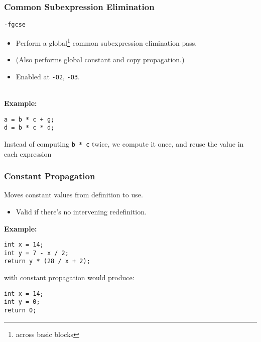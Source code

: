 \documentclass[aspectratio=43]{beamer}
\newenvironment{changemargin}[1]{%
  \begin{list}{}{%
    \setlength{\topsep}{0pt}%
    \setlength{\leftmargin}{#1}%
    \setlength{\rightmargin}{1em}
    \setlength{\listparindent}{\parindent}%
    \setlength{\itemindent}{\parindent}%
    \setlength{\parsep}{\parskip}%
  }%
  \item[]}{\end{list}}
\begin{document}
\begin{frame}[fragile]
  \frametitle{Common Subexpression Elimination}

  \begin{changemargin}{1.5cm}

  {\tt -fgcse}

  \begin{itemize}
    \item Perform a global\footnote{across basic blocks} common subexpression elimination pass.
    \item (Also performs global constant and copy propagation.)
    \item Enabled at {\tt -O2}, {\tt -O3}.
  \end{itemize}
  ~\\[1em]

  {\bf Example:} 

  \begin{lstlisting}
a = b * c + g;
d = b * c * d;
  \end{lstlisting}

  Instead of computing {\tt b * c} twice, we compute it once, and reuse the
  value in each expression
  \end{changemargin}
\end{frame}

\begin{frame}[fragile]
  \frametitle{Constant Propagation}

  \begin{changemargin}{2cm}

  Moves constant values from definition to use.

  \begin{itemize}
    \item Valid if there's no intervening redefinition.
  \end{itemize}
  \vfill
  {\bf Example:}
  \begin{lstlisting}
int x = 14;
int y = 7 - x / 2;
return y * (28 / x + 2);
  \end{lstlisting}

  with constant propagation would produce:

  \begin{lstlisting}
int x = 14;
int y = 0;
return 0;
  \end{lstlisting}
  \end{changemargin}
\end{frame}
\end{document}
